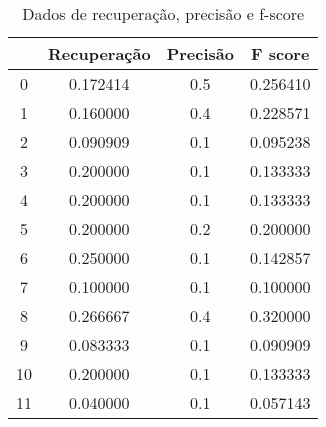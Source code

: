 \begin{table}
\centering
\caption{Dados de recuperação, precisão e f-score }
\label{tab:fscorenir}
\begin{tabular}{cccc}
\toprule
{} &  Recuperação &  Precisão &   F score \\
\midrule
0  &     0.172414 &       0.5 &  0.256410 \\
1  &     0.160000 &       0.4 &  0.228571 \\
2  &     0.090909 &       0.1 &  0.095238 \\
3  &     0.200000 &       0.1 &  0.133333 \\
4  &     0.200000 &       0.1 &  0.133333 \\
5  &     0.200000 &       0.2 &  0.200000 \\
6  &     0.250000 &       0.1 &  0.142857 \\
7  &     0.100000 &       0.1 &  0.100000 \\
8  &     0.266667 &       0.4 &  0.320000 \\
9  &     0.083333 &       0.1 &  0.090909 \\
10 &     0.200000 &       0.1 &  0.133333 \\
11 &     0.040000 &       0.1 &  0.057143 \\
\bottomrule
\end{tabular}
\end{table}
